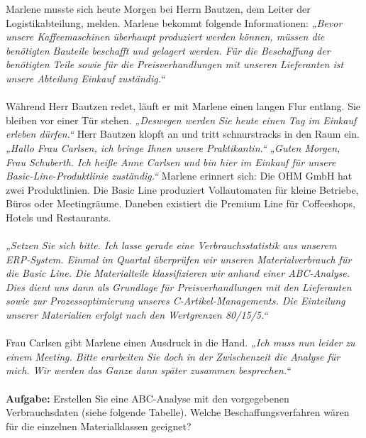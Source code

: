 Marlene musste sich heute Morgen bei Herrn Bautzen, dem Leiter der Logistikabteilung, melden.  
Marlene bekommt folgende Informationen:  
\textit{„Bevor unsere Kaffeemaschinen überhaupt produziert werden können, müssen die benötigten Bauteile beschafft und gelagert werden. Für die Beschaffung der benötigten Teile sowie für die Preisverhandlungen mit unseren Lieferanten ist unsere Abteilung Einkauf zuständig.“}
\\~\\
Während Herr Bautzen redet, läuft er mit Marlene einen langen Flur entlang.  
Sie bleiben vor einer Tür stehen.  
\textit{„Deswegen werden Sie heute einen Tag im Einkauf erleben dürfen.“} Herr Bautzen klopft an und tritt schnurstracks in den Raum ein.  
\textit{„Hallo Frau Carlsen, ich bringe Ihnen unsere Praktikantin.“}  
\textit{„Guten Morgen, Frau Schuberth. Ich heiße Anne Carlsen und bin hier im Einkauf für unsere Basic-Line-Produktlinie zuständig.“}  
Marlene erinnert sich: Die OHM GmbH hat zwei Produktlinien. Die Basic Line produziert Vollautomaten für kleine Betriebe, Büros oder Meetingräume. Daneben existiert die Premium Line für Coffeeshops, Hotels und Restaurants.  
\\~\\
\textit{„Setzen Sie sich bitte. Ich lasse gerade eine Verbrauchsstatistik aus unserem ERP-System. Einmal im Quartal überprüfen wir unseren Materialverbrauch für die Basic Line. Die Materialteile klassifizieren wir anhand einer ABC-Analyse. Dies dient uns dann als Grundlage für Preisverhandlungen mit den Lieferanten sowie zur Prozessoptimierung unseres C-Artikel-Managements. Die Einteilung unserer Materialien erfolgt nach den Wertgrenzen 80/15/5.“}  
\\~\\
Frau Carlsen gibt Marlene einen Ausdruck in die Hand.  
\textit{„Ich muss nun leider zu einem Meeting. Bitte erarbeiten Sie doch in der Zwischenzeit die Analyse für mich. Wir werden das Ganze dann später zusammen besprechen.“}
\\~\\
\textbf{Aufgabe:}  
Erstellen Sie eine ABC-Analyse mit den vorgegebenen Verbrauchsdaten (siehe folgende Tabelle).  
Welche Beschaffungsverfahren wären für die einzelnen Materialklassen geeignet?

